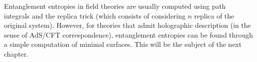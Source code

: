 Entanglement entropies in field theories are usually computed using path integrals and the replica trick (which consists of considering $n$ replica of the original system). However, for theories that admit holographic description (in the sense of AdS/CFT correspondence), entanglement entropies can be found through a simple computation of minimal surfaces. This will be the subject of the next chapter. 
